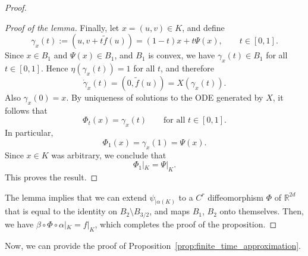 \documentclass[12pt]{amsart}
\numberwithin{equation}{section}
\theoremstyle{remark}
\begin{document}
\begin{proof}
\begin{proof}[Proof of the lemma]
Finally, let $x=(u,v)\in K$, and define
\begin{equation}
\gamma_x(t):=(u,v+t \tilde f(u))=(1-t)x+t\Psi(x), \qquad t\in[0,1].
\end{equation}
Since $x\in B_1$ and $\Psi(x)\in B_1$, and $B_1$ is convex, we have $\gamma_x(t)\in B_1$ for all $t\in[0,1]$. Hence $\eta(\gamma_x(t))=1$ for all $t$, and therefore
\begin{equation}
\dot\gamma_x(t)=(0,\tilde f(u))=X(\gamma_x(t)).
\end{equation}
Also $\gamma_x(0)=x$. By uniqueness of solutions to the ODE generated by $X$, it follows that
\begin{equation}
\Phi_t(x)=\gamma_x(t)
\qquad\text{for all } t\in[0,1].
\end{equation}
In particular,
\begin{equation}
\Phi_1(x)=\gamma_x(1)=\Psi(x).
\end{equation}
Since $x\in K$ was arbitrary, we conclude that
\begin{equation}
\Phi_1|_K=\Psi|_K.
\end{equation}
This proves the result.
\end{proof}
The lemma implies that we can extend $\psi_{|\alpha(K)}$ to a $C^r$ diffeomorphism $\Phi$ of $\mathbb R^{2d}$ that is equal to the identity on $B_2\setminus B_{3/2}$, and maps $B_1$, $B_2$ onto themselves. Then, we have $\beta\circ \Phi \circ \alpha|_K = f|_K$, which completes the proof of the proposition.

\end{proof}

Now, we can provide the proof of Proposition~\ref{prop:finite_time_approximation}.
\end{document}
